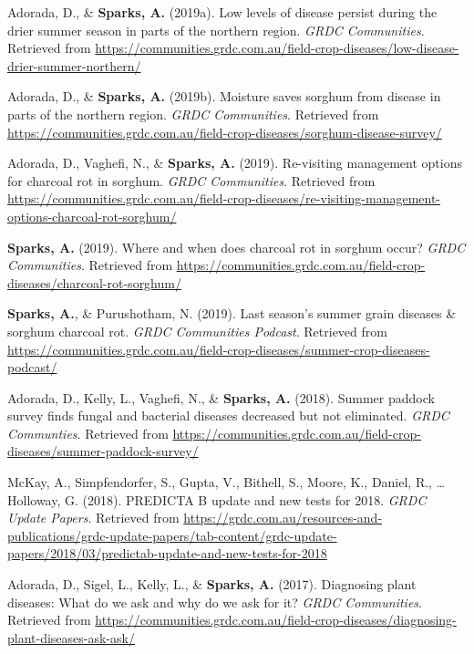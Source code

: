 \documentclass[11pt, a4paper]{awesome-cv}
\begin{document}
\leavevmode\hypertarget{ref-Adorada2019a}{}%
Adorada, D., \& \textbf{Sparks, A.} (2019a). Low levels of disease
persist during the drier summer season in parts of the northern region.
\emph{GRDC Communities}. Retrieved from
\url{https://communities.grdc.com.au/field-crop-diseases/low-disease-drier-summer-northern/}

\leavevmode\hypertarget{ref-Adorada2019b}{}%
Adorada, D., \& \textbf{Sparks, A.} (2019b). Moisture saves sorghum from
disease in parts of the northern region. \emph{GRDC Communities}.
Retrieved from
\url{https://communities.grdc.com.au/field-crop-diseases/sorghum-disease-survey/}

\leavevmode\hypertarget{ref-Adorada2019c}{}%
Adorada, D., Vaghefi, N., \& \textbf{Sparks, A.} (2019). Re-visiting
management options for charcoal rot in sorghum. \emph{GRDC Communities}.
Retrieved from
\url{https://communities.grdc.com.au/field-crop-diseases/re-visiting-management-options-charcoal-rot-sorghum/}

\leavevmode\hypertarget{ref-Sparks2019a}{}%
\textbf{Sparks, A.} (2019). Where and when does charcoal rot in sorghum
occur? \emph{GRDC Communities}. Retrieved from
\url{https://communities.grdc.com.au/field-crop-diseases/charcoal-rot-sorghum/}

\leavevmode\hypertarget{ref-Sparks2019b}{}%
\textbf{Sparks, A.}, \& Purushotham, N. (2019). Last season's summer
grain diseases \& sorghum charcoal rot. \emph{GRDC Communities Podcast}.
Retrieved from
\url{https://communities.grdc.com.au/field-crop-diseases/summer-crop-diseases-podcast/}

\leavevmode\hypertarget{ref-Adorada2019d}{}%
Adorada, D., Kelly, L., Vaghefi, N., \& \textbf{Sparks, A.} (2018).
Summer paddock survey finds fungal and bacterial diseases decreased but
not eliminated. \emph{GRDC Communties}. Retrieved from
\url{https://communities.grdc.com.au/field-crop-diseases/summer-paddock-survey/}

\leavevmode\hypertarget{ref-McKay2018}{}%
McKay, A., Simpfendorfer, S., Gupta, V., Bithell, S., Moore, K., Daniel,
R., \ldots{} Holloway, G. (2018). {PREDICTA{{}} B} update and new tests
for 2018. \emph{GRDC Update Papers}. Retrieved from
\url{https://grdc.com.au/resources-and-publications/grdc-update-papers/tab-content/grdc-update-papers/2018/03/predictab-update-and-new-tests-for-2018}

\leavevmode\hypertarget{ref-Adorada2017}{}%
Adorada, D., Sigel, L., Kelly, L., \& \textbf{Sparks, A.} (2017).
Diagnosing plant diseases: {What} do we ask and why do we ask for it?
\emph{GRDC Communities}. Retrieved from
\url{https://communities.grdc.com.au/field-crop-diseases/diagnosing-plant-diseases-ask-ask/}
\end{document}
